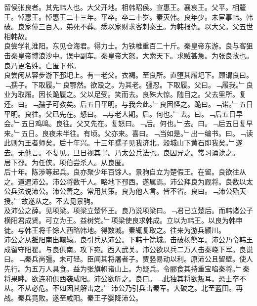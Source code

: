 \documentclass{zhvt-classic}
\begin{document}

\hspace*{2em}留侯张良者。其先韩人也。大父开地。相韩昭侯。宣惠王。襄哀王。父平。相釐王。悼惠王。悼惠王二十三年。平卒。卒二十岁。秦灭韩。良年少。未宦事韩。韩破。良家僮三百人。弟死不葬。悉以家财求客刺秦王。为韩报仇。以大父。父五世相韩故。\\
\hspace*{2em}良尝学礼淮阳。东见仓海君。得力士。为铁椎重百二十斤。秦皇帝东游。良与客狙击秦皇帝博浪沙中。误中副车。秦皇帝大怒。大索天下。求贼甚急。为张良故也。良乃更名姓。亡匿下邳。\\
\hspace*{2em}良尝闲从容步游下邳圯上。有一老父。衣褐。至良所。直堕其履圯下。顾谓良曰。﹁孺子。下取履。﹂良鄂然。欲殴之。为其老。彊忍。下取履。父曰。﹁履我。﹂良业为取履。因长跪履之。父以足受。笑而去。良殊大惊。随目之。父去里所。复还。曰。﹁孺子可教矣。后五日平明。与我会此。﹂良因怪之。跪曰。﹁诺。﹂五日平明。良往。父已先在。怒曰。﹁与老人期。后。何也。﹂去。曰。﹁后五日早会。﹂五日鸡鸣。良往。父又先在。复怒曰。﹁后。何也。﹂去。曰。﹁后五日复早来。﹂五日。良夜未半往。有顷。父亦来。喜曰。﹁当如是。﹂出一编书。曰。﹁读此则为王者师矣。后十年兴。十三年孺子见我济北。穀城山下黄石即我矣。﹂遂去。无他言。不复见。旦日视其书。乃太公兵法也。良因异之。常习诵读之。\\
\hspace*{2em}居下邳。为任侠。项伯尝杀人。从良匿。\\
\hspace*{2em}后十年。陈涉等起兵。良亦聚少年百馀人。景驹自立为楚假王。在留。良欲往从之。道遇沛公。沛公将数千人。略地下邳西。遂属焉。沛公拜良为厩将。良数以太公兵法说沛公。沛公善之。常用其策。良为他人言。皆不省。良曰。﹁沛公殆天授。﹂故遂从之。不去见景驹。\\
\hspace*{2em}及沛公之薛。见项梁。项梁立楚怀王。良乃说项梁曰。﹁君已立楚后。而韩诸公子横阳君成贤。可立为王。益树党。﹂项梁使良求韩成。立以为韩王。以良为韩申徒。与韩王将千馀人西略韩地。得数城。秦辄复取之。往来为游兵颍川。\\
\hspace*{2em}沛公之从雒阳南出轘辕。良引兵从沛公。下韩十馀城。击破杨熊军。沛公乃令韩王成留守阳翟。与良俱南。攻下宛。西入武关。沛公欲以兵二万人击秦峣下军。良说曰。﹁秦兵尚彊。未可轻。臣闻其将屠者子。贾竖易动以利。原沛公且留壁。使人先行。为五万人具食。益为张旗帜诸山上。为疑兵。令郦食其持重宝啗秦将。﹂秦将果畔。欲连和俱西袭咸阳。沛公欲听之。良曰。﹁此独其将欲叛耳。恐士卒不从。不从必危。不如因其解击之。﹂沛公乃引兵击秦军。大破之。北至蓝田。再战。秦兵竟败。遂至咸阳。秦王子婴降沛公。\\
\end{document}
